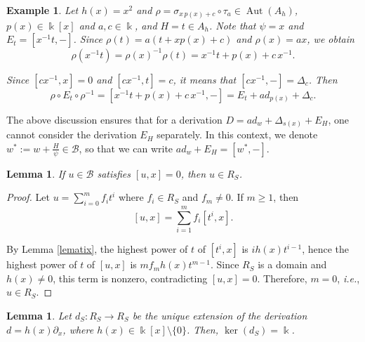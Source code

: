\documentclass{article}
\numberwithin{equation}{section}\theoremstyle{plain}
\newtheorem{lemma}[theorem]{Lemma}
\newtheorem{example}[theorem]{Example}
\newcommand{\der}{{\rm Der}}
\DeclareMathOperator{\Aut}{Aut}
\begin{document}
\begin{example}
Let $h(x) = x^2$ and $\rho=\sigma_{x \, p(x) + c } \circ \tau_a \in \Aut(A_h)$, $p(x)\in\Bbbk[x]$ and $a, c\in\Bbbk$, and $H=t \in A_h$.
Note that $\psi=x$ and $E_t=[x^{-1}t,-]$.
Since $\rho(t)=a(t+x p(x)+c)$ and $\rho(x)=ax$, we obtain
$$ \rho(x^{-1}t)=\rho(x)^{-1}\rho(t)
=x^{-1}t+p(x)+c\,x^{-1}.$$

Since $[cx^{-1},x]=0$ and $[cx^{-1},t]=c$, it means that $[cx^{-1},-]=\Delta_c$.
Then
$$
\rho\circ E_t\circ\rho^{-1}
=
[x^{-1}t+p(x)+c\,x^{-1},-]
=
E_t+ad_{p(x)}+\Delta_c.$$
\end{example}

\medbreak

The above discussion ensures that for a derivation $D=ad_w+\Delta_{s(x)}+E_H$, one cannot consider the derivation $E_H$ separately.
In this context, we denote $w^\ast := w + \tfrac{H}{\psi} \in \mathcal{B}$,
so that we can write $ad_w + E_H = [w^\ast, - ]$.

\begin{lemma}\label{R_S} If $u \in \mathcal B$ satisfies $[u,x]=0$, then $u \in R_S$.
\end{lemma}

\begin{proof}
Let $u=\sum_{i=0}^m f_i t^i$ where $f_i\in R_S$ and $f_m \neq 0$.
If $m\ge1$, then
$$[u,x]=\sum_{i=1}^m f_i[t^i,x].$$

By Lemma \ref{lematix}, the highest power of $t$ of $[t^i,x]$ is $ih(x)t^{i-1}$, hence the highest power of $t$ of $[u,x]$ is $mf_m h(x)t^{m-1}$. Since $R_S$ is a domain and $h(x)\neq0$, this term is nonzero, contradicting $[u,x]=0$. Therefore, $m=0$, \emph{i.e.}, $u\in R_S$.
\end{proof}

\begin{lemma} \label{Kerds}Let $d_S:R_S\to R_S$ be the unique extension of the derivation $d=h(x)\partial_x$, where $h(x)\in\Bbbk[x]\setminus\{0\}$. Then, $\ker(d_S)=\Bbbk$.    
\end{lemma}
\end{document}
